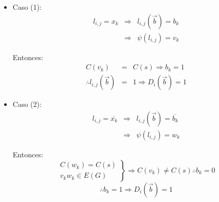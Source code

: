 \documentclass[12pt,a4paper]{report}
\newcounter{neq}
\begin{document}
		\begin{itemize}
			\item Caso (1):
				\begin{eqnarray}
						\nonumber l_{i, j} = x_{k} &\Rightarrow & l_{i, j}(\overrightarrow{b}) = b_{k} \\
						\nonumber &\Rightarrow& \psi(l_{i, j}) = v_{k}
				\end{eqnarray}
				\par Entonces:
				\begin{eqnarray}
						\nonumber C(v_{k}) &=& C(s) \Rightarrow b_{k} = 1 \\
						\nonumber \therefore l_{i, j}(\overrightarrow{b}) &=& 1 \Rightarrow D_{i}(\overrightarrow{b}) = 1
				\end{eqnarray}
			\item Caso (2):
				\begin{eqnarray}
						\nonumber l_{i, j} = \overline{x_{k}} &\Rightarrow & l_{i, j}(\overrightarrow{b}) = 	\overline{b_{k}} \\
						\nonumber &\Rightarrow& \psi(l_{i, j}) = w_{k}
				\end{eqnarray}
				\par Entonces:
				\begin{equation*}
  					\left.
  					\begin{array}{l}
    		 			C(w_{k}) = C(s) \\
    		 			v_{k} w_{k} \in E(G)
  					\end{array}
 			 		\right\rbrace
 			 		\Rightarrow C(v_{k}) \neq C(s) \therefore b_{k} = 0
				\end{equation*}
				\[ \therefore b_{k} = 1 \Rightarrow D_{i}(\overrightarrow{b}) = 1 \]
		\end{itemize}
\end{document}
